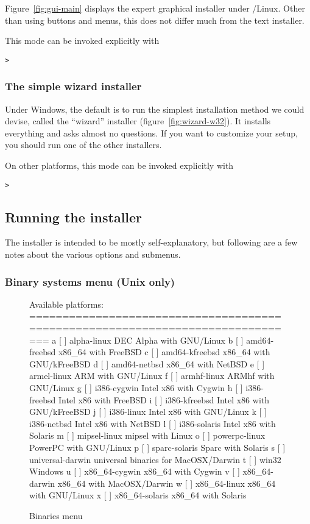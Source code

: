 \documentclass{article}
\begin{document}
Figure~\ref{fig:gui-main} displays the expert graphical installer under
\GNU/Linux.  Other than using buttons and menus, this does
not differ much from the text installer.

This mode can be invoked explicitly with
\begin{alltt}
> 
\end{alltt}


\subsubsection{The simple wizard installer}

Under Windows, the default is to run the simplest installation method we
could devise, called the ``wizard'' installer
(figure~\ref{fig:wizard-w32}).  It installs everything and asks almost
no questions.  If you want to customize your setup, you should run one
of the other installers.

On other platforms, this mode can be invoked explicitly with
\begin{alltt}
> 
\end{alltt}


\subsection{Running the installer}
\label{sec:runinstall}

The installer is intended to be mostly self-explanatory, but following are a
few notes about the various options and submenus.

\subsubsection{Binary systems menu (Unix only)}
\label{sec:binary}

\begin{figure}[tb]
\begin{boxedverbatim}
Available platforms:
===============================================================================
   a [ ] alpha-linux      DEC Alpha with GNU/Linux
   b [ ] amd64-freebsd    x86_64 with FreeBSD
   c [ ] amd64-kfreebsd   x86_64 with GNU/kFreeBSD
   d [ ] amd64-netbsd     x86_64 with NetBSD
   e [ ] armel-linux      ARM with GNU/Linux
   f [ ] armhf-linux      ARMhf with GNU/Linux
   g [ ] i386-cygwin      Intel x86 with Cygwin
   h [ ] i386-freebsd     Intel x86 with FreeBSD
   i [ ] i386-kfreebsd    Intel x86 with GNU/kFreeBSD
   j [ ] i386-linux       Intel x86 with GNU/Linux
   k [ ] i386-netbsd      Intel x86 with NetBSD
   l [ ] i386-solaris     Intel x86 with Solaris
   m [ ] mipsel-linux     mipsel with Linux
   o [ ] powerpc-linux    PowerPC with GNU/Linux
   p [ ] sparc-solaris    Sparc with Solaris
   s [ ] universal-darwin universal binaries for MacOSX/Darwin
   t [ ] win32            Windows
   u [ ] x86_64-cygwin    x86_64 with Cygwin
   v [ ] x86_64-darwin    x86_64 with MacOSX/Darwin
   w [ ] x86_64-linux     x86_64 with GNU/Linux
   x [ ] x86_64-solaris   x86_64 with Solaris
\end{boxedverbatim}
\caption{Binaries menu}\label{fig:bin-text}
\end{figure}
\end{document}
